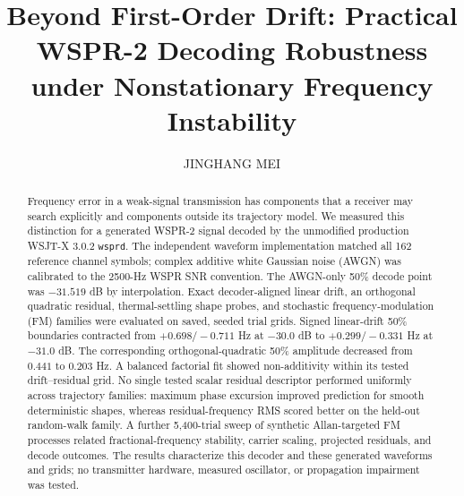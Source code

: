 \documentclass{ieeeaccess}
\begin{document}
\doi{}
\title{Beyond First-Order Drift: Practical WSPR-2 Decoding Robustness under Nonstationary Frequency Instability}
\author{\uppercase{Jinghang Mei}}
\address[1]{School of Electrical and Computer Engineering, The University of Sydney, Sydney, NSW, Australia (e-mail: jmei0175@uni.sydney.edu.au)}

\begin{abstract}
Frequency error in a weak-signal transmission has components that a receiver may search explicitly and components outside its trajectory model. We measured this distinction for a generated WSPR-2 signal decoded by the unmodified production WSJT-X 3.0.2 \texttt{wsprd}. The independent waveform implementation matched all 162 reference channel symbols; complex additive white Gaussian noise (AWGN) was calibrated to the 2500-Hz WSPR SNR convention. The AWGN-only 50\% decode point was $-31.519$ dB by interpolation. Exact decoder-aligned linear drift, an orthogonal quadratic residual, thermal-settling shape probes, and stochastic frequency-modulation (FM) families were evaluated on saved, seeded trial grids. Signed linear-drift 50\% boundaries contracted from $+0.698/-0.711$ Hz at $-30.0$ dB to $+0.299/-0.331$ Hz at $-31.0$ dB. The corresponding orthogonal-quadratic 50\% amplitude decreased from $0.441$ to $0.203$ Hz. A balanced factorial fit showed non-additivity within its tested drift--residual grid. No single tested scalar residual descriptor performed uniformly across trajectory families: maximum phase excursion improved prediction for smooth deterministic shapes, whereas residual-frequency RMS scored better on the held-out random-walk family. A further 5,400-trial sweep of synthetic Allan-targeted FM processes related fractional-frequency stability, carrier scaling, projected residuals, and decode outcomes. The results characterize this decoder and these generated waveforms and grids; no transmitter hardware, measured oscillator, or propagation impairment was tested.
\end{abstract}
\end{document}
